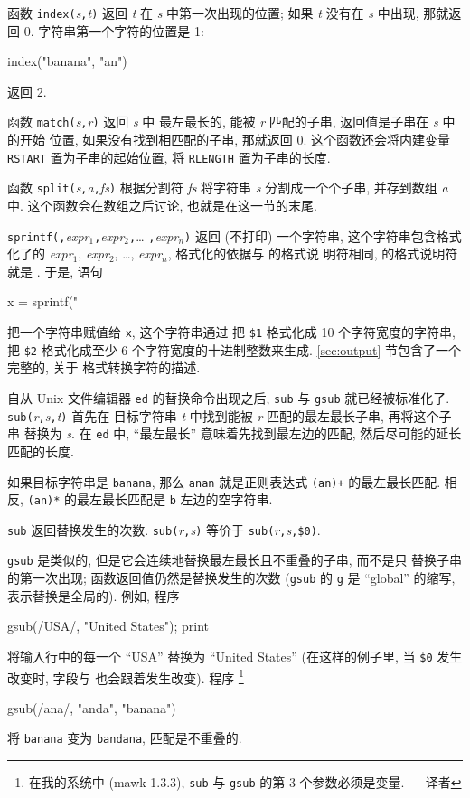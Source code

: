 函数 \verb'index('\textit{s}\verb','\textit{t}\verb')' 返回 \textit{t} 在
\textit{s} 中第一次出现的位置; 如果 \textit{t} 没有在 \textit{s} 中出现,
那就返回 0. 字符串第一个字符的位置是 1:
\begin{awkcode}
    index("banana", "an")
\end{awkcode}
返回 2.

函数 \verb'match('\textit{s}\verb','\textit{r}\verb')' 返回 \textit{s} 中
最左最长的, 能被 \textit{r} 匹配的子串, 返回值是子串在 \textit{s} 中的开始
位置, 如果没有找到相匹配的子串, 那就返回 0. 这个函数还会将内建变量
\verb'RSTART' 置为子串的起始位置, 将 \verb'RLENGTH' 置为子串的长度.

函数 \verb'split('\textit{s}\verb','\textit{a}\verb','\textit{fs}\verb')'
根据分割符 \textit{fs} 将字符串 \textit{s} 分割成一个个子串, 并存到数组
\textit{a} 中. 这个函数会在数组之后讨论, 也就是在这一节的末尾.

\verb'sprintf('\fmt\verb','\textit{expr}$_1$\verb','\textit{expr}$_2$\verb','\ldots%
\verb','\textit{expr}$_n$\verb')' 返回 (不打印) 一个字符串,
这个字符串包含格式%
化了的
\textit{expr}$_1$, \textit{expr}$_2$, \ldots, \textit{expr}$_n$,
格式化的依据与 \printf 的格式说
明符相同, \printf 的格式说明符就是 \fmt. 于是, 语句
\begin{awkcode}
    x = sprintf("%
\end{awkcode}
把一个字符串赋值给 \verb'x', 这个字符串通过%
把 \verb'$1' 格式化成 10 个字符宽度的字符串, 把 \verb'$2' 格式化成至少 6
个字符宽度的十进制整数来生成. \ref{sec:output} 节包含了一个完整的, 关于
格式转换字符的描述.

自从 Unix 文件编辑器 \verb'ed' 的替换命令出现之后, \verb'sub' 与
\verb'gsub' 就已经被标准化了.
\verb'sub('\textit{r}\verb','\textit{s}\verb','\textit{t}\verb')' 首先在
目标字符串 \textit{t} 中找到能被 \textit{r} 匹配的最左最长子串,
再将这个子串
替换为 \textit{s}. 在 \verb'ed' 中, ``最左最长'' 意味着先找到最左边的匹配,
然后尽可能的延长匹配的长度.

如果目标字符串是 \verb'banana', 那么 \verb'anan' 就是正则表达式
\verb'(an)+' 的最左最长匹配. 相反, \verb'(an)*' 的最左最长匹配是 \verb'b'
左边的空字符串.

\verb'sub' 返回替换发生的次数.
\verb'sub('\textit{r}\verb','\textit{s}\verb')' 等价于
\verb'sub('\textit{r}\verb','\textit{s}\verb','\verb'$0'\verb')'.

\verb'gsub' 是类似的, 但是它会连续地替换最左最长且不重叠的子串, 而不是只
替换子串的第一次出现; 函数返回值仍然是替换发生的次数
(\verb'gsub' 的 \verb'g' 是 ``global'' 的缩写, 表示替换是全局的). 例如,
程序
\begin{awkcode}
    { gsub(/USA/, "United States"); print }
\end{awkcode}
将输入行中的每一个 ``USA'' 替换为 ``United States'' (在这样的例子里,
当 \verb'$0' 发生改变时, 字段与 \nf 也会跟着发生改变). 程序
\footnote{在我的系统中 (mawk-1.3.3), \texttt{sub} 与 \texttt{gsub}
的第 3 个参数必须是变量. --- 译者}
\begin{awkcode}
    gsub(/ana/, "anda", "banana")
\end{awkcode}
将 \verb'banana' 变为 \verb'bandana', 匹配是不重叠的.

